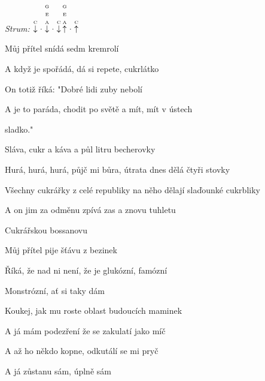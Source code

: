 \begin{song}


\textit{Strum:} $\PluckDown{C}\Miss\PluckDown{G \\ E \\ A}\Miss\PluckDown{C}\PluckUp{G \\ E \\ A}\Miss\PluckUp{C}$

\large


\large

\bigskip

Můj přítel  snídá sedm kremrolí  \par
A když je spořádá, dá si repete, cukrlátko  \par
On totiž říká:  "Dobré lidi zuby nebolí  \par
A je to paráda, chodit po světě a mít, mít v ústech \par
{}sladko."    \par

\bigskip

\begin{chorusboxwide}{\Refren}
Sláva,  cukr a káva a půl litru becherovky \par
{}Hurá, hurá, hurá, půjč mi bůra, útrata dnes dělá čtyři stovky \par
Všechny cukrářky z celé  republiky na něho dělají slaďounké cukrbliky \par
A on jim za odměnu zpívá zas a znovu tuhletu  \par
Cukrářskou bossanovu    \par
\end{chorusboxwide}

\bigskip

Můj přítel  pije šťávu z bezinek  \par
Říká, že nad ni není, že je glukózní, famózní \par
{}Monstrózní, ať si taky dám \par
Koukej, jak mu roste  oblast budoucích maminek  \par
A já mám podezření že se zakulatí jako míč \par
A až ho někdo kopne, odkutálí se mi pryč \par
A já zůstanu sám,  úplně sám  \par


\end{song}
